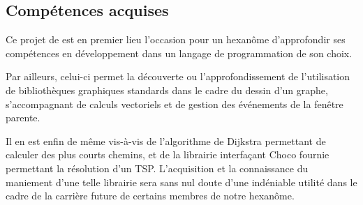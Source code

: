 \subsection{Compétences acquises}
Ce projet de est en premier lieu l'occasion pour un hexanôme d'approfondir ses compétences en développement dans un langage de programmation de son choix.

Par ailleurs, celui-ci permet la découverte ou l'approfondissement de l'utilisation de bibliothèques graphiques standards dans le cadre du dessin d'un graphe, s'accompagnant de calculs vectoriels et de gestion des événements de la fenêtre parente.

Il en est enfin de même vis-à-vis de l'algorithme de Dijkstra permettant de calculer des plus courts chemins, et de la librairie interfaçant Choco fournie permettant la résolution d'un TSP. L'acquisition et la connaissance du maniement d'une telle librairie sera sans nul doute d'une indéniable utilité dans le cadre de la carrière future de certains membres de notre hexanôme.
\clearpage
